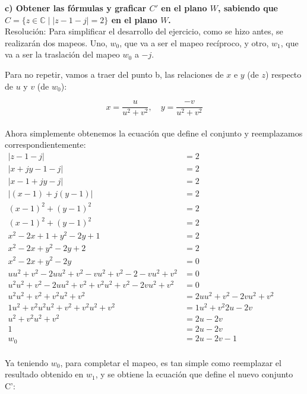 \documentclass[12pt]{report}
\begin{document}
\textbf{c) Obtener las fórmulas y graficar \( C' \) en el plano \( W \), sabiendo que \( C = \{z \in \mathbb{C} \mid |z - 1 - j| = 2\} \) en el plano \( W \).}\\[6pt]

Resolución: Para simplificar el desarrollo del ejercicio, como se hizo antes, se realizarán dos mapeos. Uno, \( w_0 \), que va a ser el mapeo recíproco, y otro, \( w_1 \), que va a ser la traslación del mapeo \( w_0 \) a \( -j \).

Para no repetir, vamos a traer del punto b, las relaciones de \( x \) e \( y \) (de \( z \)) respecto de \( u \) y \( v \) (de \( w_0 \)):

$$ x = \frac{u}{u^2 + v^2}, \quad y = \frac{-v}{u^2 + v^2} $$\\[6pt]

Ahora simplemente obtenemos la ecuación que define el conjunto y reemplazamos correspondientemente:\\[6pt]
\begin{math}
\begin{aligned}
|z-1-j| &= 2 \\[6pt]
|x+jy-1-j| &= 2 \\[6pt]
|x-1+jy-j| &= 2 \\[6pt]
|(x-1)+j(y-1)| &= 2 \\[6pt]
(x-1)^2 + (y-1)^2 &= 2 \\[6pt]
(x-1)^2 + (y-1)^2 &= 2 \\[6pt]
x^2 - 2x + 1 + y^2 - 2y + 1 &= 2 \\[6pt]
x^2 - 2x + y^2 - 2y + 2 &= 2 \\[6pt]
x^2 - 2x + y^2 - 2y &= 0 \\[6pt]
uu^2 + v^2 - 2uu^2 + v^2 - vu^2 + v^2 - 2 - vu^2 + v^2 &= 0 \\[6pt]
u^2 u^2 + v^2 - 2uu^2 + v^2 + v^2 u^2 + v^2 - 2vu^2 + v^2 &= 0 \\[6pt]
u^2 u^2 + v^2 + v^2 u^2 + v^2 &= 2uu^2 + v^2 - 2vu^2 + v^2 \\[6pt]
1 u^2 + v^2 u^2 u^2 + v^2 + v^2 u^2 + v^2 &= 1 u^2 + v^2 2u - 2v \\[6pt]
u^2 + v^2 u^2 + v^2 &= 2u - 2v \\[6pt]
1 &= 2u - 2v \\[6pt]
w_0 &= 2u - 2v - 1\\[6pt]
\end{aligned}
\end{math}

Ya teniendo $w_0$, para completar el mapeo, es tan simple como reemplazar el resultado obtenido en $w_1$, y se obtiene la ecuación que define el nuevo conjunto C':\\
\end{document}
